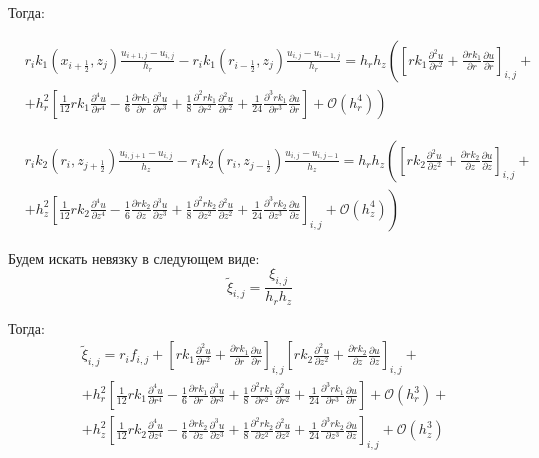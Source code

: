 Тогда:

\begin{align*}
  &r_i k_1(x_{i + \frac{1}{2}}, z_j) \frac{u_{i + 1, j} - u_{i, j}}{h_r} - r_i k_1 (r_{i - \frac{1}{2}}, z_j) \frac{u_{i,j} - u_{i - 1, j}}{h_r} =
  h_r h_z \left( \left[ rk_1 \frac{\partial^2 u}{\partial r^2} + \frac{\partial rk_1}{\partial r}\frac{\partial u}{\partial r} \right]_{i, j} \right. + \\
  &+ \left. h^2_r\left[ \frac{1}{12} r k_1 \frac{\partial^4 u}{\partial r^4} - \frac{1}{6}\frac{\partial rk_1}{\partial r}\frac{\partial^3 u}{\partial r^3}
  + \frac{1}{8} \frac{\partial^2 rk_1}{\partial r^2}\frac{\partial^2 u}{\partial r^2}
  + \frac{1}{24} \frac{\partial^3 rk_1}{\partial r^3}\frac{\partial u}{\partial r} \right] + \mathcal{O}(h_r^4) \right)
\end{align*}


\begin{align*}
  &r_{i} k_2(r_i, z_{j+\frac{1}{2}}) \frac{u_{i, j + 1} - u_{i, j}}{h_z} - r_{i} k_2(r_i, z_{j-\frac{1}{2}}) \frac{u_{i, j} - u_{i, j - 1}}{h_z} =
  h_r h_z \left(
    \left[ r k_2 \frac{\partial^2 u}{\partial z^2}
    + \frac{\partial r k_2}{\partial z} \frac{\partial u}{\partial z} \right]_{i, j}
   \right. +\\
  &+ \left. h^2_z \left[
    \frac{1}{12} r k_2 \frac{\partial^4 u}{\partial z^4} - \frac{1}{6} \frac{\partial r k_2}{\partial z} \frac{\partial^3 u}{\partial z^3}
    + \frac{1}{8} \frac{\partial^2 r k_2}{\partial z^2} \frac{\partial^2 u}{\partial z^2}
    + \frac{1}{24} \frac{\partial^3 r k_2}{\partial z^3} \frac{\partial u}{\partial z}
     \right]_{i, j} + \mathcal{O}(h_z^4) \right)
\end{align*}

Будем искать невязку в следующем виде:
\[
  \tilde{\xi}_{i, j} = \frac{\xi_{i, j}}{h_r h_z}
\]

Тогда:
\begin{align*}
  &\tilde{\xi}_{i, j} = r_if_{i, j} + \left[ rk_1 \frac{\partial^2 u}{\partial r^2} + \frac{\partial rk_1}{\partial r}\frac{\partial u}{\partial r} \right]_{i, j} \left[ r k_2 \frac{\partial^2 u}{\partial z^2}
  + \frac{\partial r k_2}{\partial z} \frac{\partial u}{\partial z} \right]_{i, j} + \\
  &+h^2_r\left[ \frac{1}{12} r k_1 \frac{\partial^4 u}{\partial r^4} - \frac{1}{6}\frac{\partial rk_1}{\partial r}\frac{\partial^3 u}{\partial r^3}
  + \frac{1}{8} \frac{\partial^2 rk_1}{\partial r^2}\frac{\partial^2 u}{\partial r^2}
  + \frac{1}{24} \frac{\partial^3 rk_1}{\partial r^3}\frac{\partial u}{\partial r} \right] + \mathcal{O}(h_r^3) + \\
  &+ h^2_z \left[
    \frac{1}{12} r k_2 \frac{\partial^4 u}{\partial z^4} - \frac{1}{6} \frac{\partial r k_2}{\partial z} \frac{\partial^3 u}{\partial z^3}
    + \frac{1}{8} \frac{\partial^2 r k_2}{\partial z^2} \frac{\partial^2 u}{\partial z^2}
    + \frac{1}{24} \frac{\partial^3 r k_2}{\partial z^3} \frac{\partial u}{\partial z}
     \right]_{i, j} + \mathcal{O}(h_z^3)
\end{align*}

